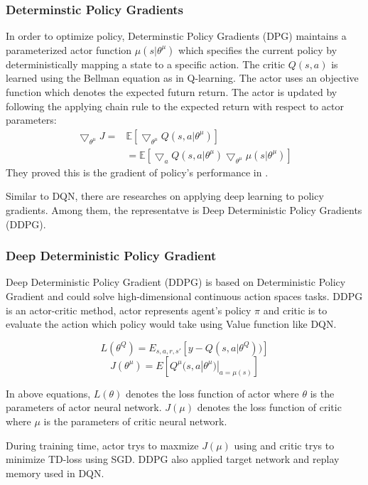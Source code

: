 \documentclass[11pt,twocolumn]{jarticle} %
\begin{document}
\subsubsection{Determinstic Policy Gradients\cite{dpg}}

In order to optimize policy, Determinstic Policy Gradients (DPG) maintains a parameterized actor function $\mu(s|\theta^\mu)$ which specifies the current policy by deterministically mapping a state to a specific action. The critic $Q(s, a)$ is learned using the Bellman equation as in Q-learning. The actor uses an objective function which denotes the expected futurn return. The actor is updated by following the applying chain rule to the expected return with respect to actor parameters:
\begin{equation}
\begin{split}
\bigtriangledown_{\theta^\mu}J = & \mathbb{E}[\bigtriangledown_{\theta^\mu}Q(s, a|\theta^\mu)] \\
& = \mathbb{E}[\bigtriangledown_{a}Q(s, a|\theta^\mu)\bigtriangledown_{\theta^\mu}\mu(s|\theta^\mu)]
\end{split}
\end{equation}
They proved this is the gradient of policy's performance in \cite{dpg}. \par

Similar to DQN, there are researches on applying deep learning to policy gradients. Among them, the representatve is Deep Deterministic Policy Gradients (DDPG)\cite{ddpg}. 

\subsubsection{Deep Deterministic Policy Gradient\cite{ddpg}}
Deep Deterministic Policy Gradient (DDPG) is based on Deterministic Policy Gradient \cite{dpg} and could solve high-dimensional continuous action spaces tasks. DDPG is an actor-critic method, actor represents agent's policy $\pi$ and critic is to evaluate the action which policy would take using Value function like DQN. 

\begin{equation}
L(\theta^Q) = E_{s,a,r,s'}[y - Q(s, a|\theta^Q))] 
\end{equation}
\begin{equation}
J(\theta^\mu) = E[Q^\mu(s, a|\theta^\mu) | _{a=\mu(s)}]
\end{equation}

In above equations, $L(\theta)$ denotes the loss function of actor where $\theta$ is the parameters of actor neural network. $J(\mu)$ denotes the loss function of critic where $\mu$ is the parameters of critic neural network. \par
During training time, actor trys to maxmize $J(\mu)$ using  and critic trys to minimize TD-loss using SGD. DDPG also applied target network and replay memory used in DQN. \par
\end{document}
